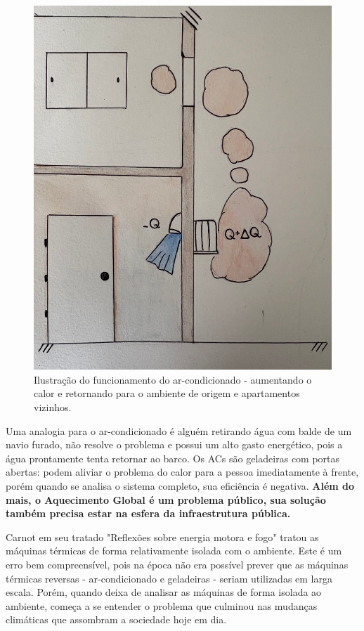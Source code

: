\begin{figure}[h]
    \centering
    \includegraphics[scale=0.35]{pictures/predio.png}
    \caption{Ilustração do funcionamento do ar-condicionado - aumentando o calor e retornando para o ambiente de origem e apartamentos vizinhos.}
    \label{carnot}
\end{figure}

Uma analogia para o ar-condicionado é alguém retirando água com balde de um navio furado, não resolve o problema e possui um alto gasto energético, pois a água prontamente tenta retornar ao barco. Os ACs são geladeiras com portas abertas: podem aliviar o problema do calor para a pessoa imediatamente à frente, porém quando se analisa o sistema completo, sua eficiência é negativa.\textbf{ Além do mais, o Aquecimento Global é um problema público, sua solução também precisa estar na esfera da infraestrutura pública.}
                                  
Carnot em seu tratado "Reflexões sobre energia motora e fogo" tratou as máquinas térmicas de forma relativamente isolada com o ambiente. Este é um erro bem compreensível, pois na época não era possível prever que as máquinas térmicas reversas - ar-condicionado e geladeiras - seriam utilizadas em larga escala. Porém, quando deixa de analisar as máquinas de forma isolada ao ambiente, começa a se entender o problema que culminou nas mudanças climáticas que assombram a sociedade hoje em dia.                                                         

